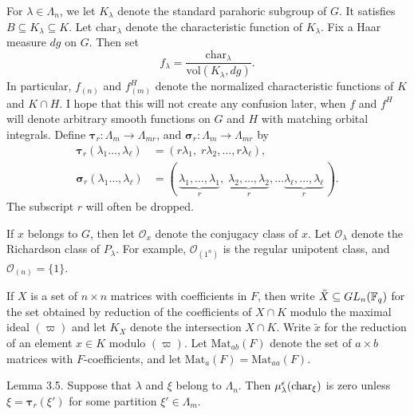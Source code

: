 \documentclass{amsart}
\begin{document}
For $\lambda\in\Lambda_n$, we let $K_\lambda$ denote
the standard parahoric subgroup of $G$.  It satisfies
$B\subseteq K_\lambda\subseteq K$.  Let $\text{char}_\lambda$
denote the characteristic function of $K_\lambda$.
Fix a Haar measure $dg$ on $G$.  Then set
$$f_{\lambda}
     = \frac
           { \text{char}_{\lambda} }
           { \text{vol}(K_{\lambda}, dg) }.$$
  In particular, 
     $ f_{(n)} $ and $f^H_{(m)}$ denote the normalized
     characteristic functions of $K$ and $K\cap H$.  I
     hope that this will not create any confusion later,
     when $f$ and $f^H$ will denote arbitrary 
     smooth functions on $G$ and $H$ with matching
     orbital integrals.
   Define $\pmb\tau_r:\Lambda_m\to\Lambda_{mr}$,
  and $\pmb\sigma_r:\Lambda_m\to\Lambda_{mr}$ by
\begin{align*}
    \pmb\tau_r
      (\lambda_1 \dots , \lambda_{\ell} ) &=
      (r \lambda_1, \; r \lambda_2, \dots , r \lambda_{\ell} ), \;\;\;
\\
  \pmb\sigma_r
     (\lambda_1 \dots , \lambda_{\ell} ) &=
  ( \,
        \underbrace{\lambda_1, \dots, \lambda_1}_{r} , \;
        \underbrace{\lambda_2, \dots, \lambda_2}_{r} , \dots
        \underbrace{\lambda_{\ell}, \dots, \lambda_{\ell}}_{r} \, 
  ).
\end{align*}
%
The subscript $r$ will often be dropped.

If $ x$ belongs to $G$, then let $ \mathcal O_x $
    denote the conjugacy class of $x$.
%
Let ${\mathcal O}_{\lambda}$ denote the Richardson class of 
      $ P_{\lambda} $.
%
  For example,  $ {\mathcal O}_{(1^n)}$ is the 
regular unipotent class, and $ {\mathcal O}_{(n)} = \{1\} $.


If $X$ is a set of 
  $ n \times n $
matrices with coefficients in $F$, then write
  $ \tilde{X} \subseteq GL_n ({\Bbb F}_q) $
for the set obtained by reduction of the coefficients of 
  $ X \cap K $
modulo the maximal ideal $(\varpi)$
and let
  $ K_X $ denote the intersection
  $ X \cap K $.
Write
  $ \tilde{x} $
for the reduction of
  an element $ x \in K$
modulo $(\varpi)$.
Let
  $ \text{Mat}_{ab} (F) $
denote the set of 
  $ a \times b $
matrices with  $F$-coefficients, and let
  $ \text{Mat}_a (F) = \text{Mat}_{aa} (F) $.

\proclaim Lemma {3.5}.
Suppose that $\lambda$ and $\xi$ belong to $\Lambda_n$.
Then
  $ \mu_{\lambda}^{\epsilon}
    (\text{{\rm char}}_{\xi})$ is zero
unless
  $ \xi = \pmb\tau_r (\xi') $
for some partition
  $ \xi' \in \Lambda_m $.
\finishproclaim
\end{document}
